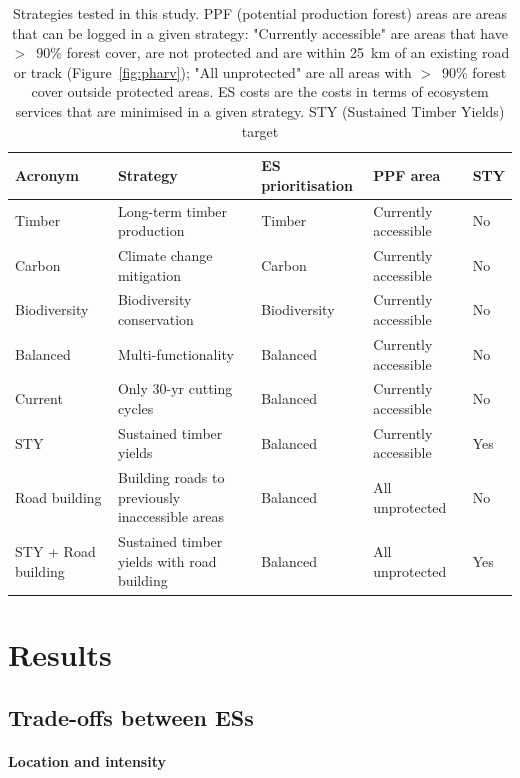 \documentclass{article}
\begin{document}
\begin{table}
    \centering
    \begin{tabularx}{\textwidth}{p{2cm} p{3cm} p{2cm} p{2cm} p{0.8cm}}
    \toprule
         Acronym & Strategy & ES prioritisation & PPF area &  STY \\
         \midrule
         Timber & Long-term timber production & Timber  & Currently accessible& No \\
         Carbon & Climate change mitigation &  Carbon & Currently accessible & No \\
         Biodiversity & Biodiversity conservation &  Biodiversity & Currently accessible & No \\
         Balanced & Multi-functionality & Balanced & Currently accessible & No \\
         Current & Only 30-yr cutting cycles & Balanced & Currently accessible & No \\
         STY & Sustained timber yields & Balanced & Currently accessible & Yes \\
         Road building & Building roads to previously inaccessible areas & Balanced & All unprotected & No \\
         STY + Road building & Sustained timber yields with road building & Balanced & All unprotected & Yes \\
         \bottomrule
    \end{tabularx}
    \caption{Strategies tested in this study. PPF (potential production forest) areas are areas that can be logged in a given strategy: "Currently accessible" are areas that have $>$~90\% forest cover, are not protected and are within 25~km of an existing road or track (Figure~\ref{fig:pharv}); "All unprotected" are all areas with $>$~90\% forest cover outside protected areas. ES costs are the costs in terms of ecosystem services that are minimised in a given strategy. STY (Sustained Timber Yields) target }
    \label{tab:strategies}
\end{table}

\section{Results}

\subsection{Trade-offs between ESs}

\paragraph{Location and intensity}
\end{document}
